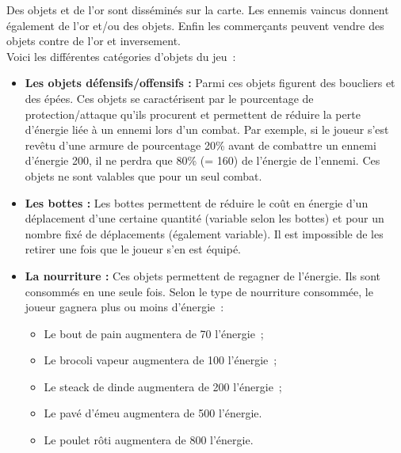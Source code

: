 \documentclass[11pt]{article}
\begin{document}
Des objets et de l'or sont disséminés sur la carte. Les ennemis vaincus donnent également de l'or et/ou des objets. Enfin les commerçants peuvent vendre des objets contre de l'or et inversement.\\
Voici les différentes catégories d'objets du jeu~:

\begin{itemize}
   \item \textbf{Les objets défensifs/offensifs : }Parmi ces objets figurent des boucliers et des épées. Ces objets se caractérisent par le pourcentage de protection/attaque qu'ils procurent et permettent de réduire la perte d'énergie liée à un ennemi lors d'un combat. Par exemple, si le joueur s'est revêtu d'une armure de pourcentage 20\% avant de combattre un ennemi d'énergie 200, il ne perdra que 80\% (= 160) de l'énergie de l'ennemi. Ces objets ne sont valables que pour un seul combat.
   \item \textbf{Les bottes : }Les bottes permettent de réduire le coût en énergie d'un déplacement d'une certaine quantité (variable selon les bottes) et pour un nombre fixé de déplacements (également variable). Il est impossible de les retirer une fois que le joueur s'en est équipé.
   \item \textbf{La nourriture : }Ces objets permettent de regagner de l'énergie. Ils sont consommés en une seule fois. Selon le type de nourriture consommée, le joueur gagnera plus ou moins d'énergie~:
   \begin{itemize}
      \item Le bout de pain augmentera de 70 l'énergie~;
      \item Le brocoli vapeur augmentera de 100 l'énergie~;
      \item Le steack de dinde augmentera de 200 l'énergie~;
      \item Le pavé d'émeu augmentera de 500 l'énergie.
      \item Le poulet rôti augmentera de 800 l'énergie.
   \end{itemize}
\end{itemize}
\end{document}
